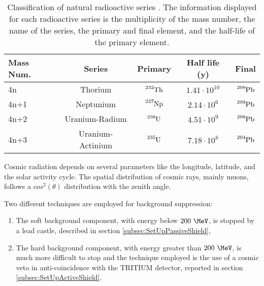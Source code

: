 \begin{table}[htbp]
\centering{}%
\begin{tabular}{lcccc}
\toprule 
Mass Num. & Series & Primary & Half life (y) & Final \tabularnewline
\midrule
\midrule 
4n & Thorium & $\ce{^{232}Th}$ & $1.41 \cdot{} 10^{10}$ & $\ce{^{208}Pb}$ \tabularnewline
4n+1 & Neptunium & $\ce{^{237}Np}$ & $2.14 \cdot{} 10^{6}$ & $\ce{^{209}Pb}$ \tabularnewline
4n+2 & Uranium-Radium & $\ce{^{238}U}$ & $4.51 \cdot{} 10^{9}$ & $\ce{^{206}Pb}$ \tabularnewline
4n+3 & Uranium-Actinium & $\ce{^{235}U}$ & $7.18 \cdot{} 10^{8}$ & $\ce{^{204}Pb}$ \tabularnewline
\bottomrule
\end{tabular}
\caption{Classification of natural radioactive series \cite{NaturalRadioactiveSeries1, NaturalRadioactiveSeries2}. The information displayed for each radioactive series is the multiplicity of the mass number, the name of the series, the primary and final element, and the half-life of the primary element.}
\label{tab:NaturalRadioactiveSeries}
\end{table}
Cosmic radiation depends on several parameters like the longitude, latitude, and the solar activity cycle. The spatial distribution of cosmic rays, mainly muons, follows a $cos^2(\theta)$ distribution with the zenith angle. 

Two different techniques are employed for background suppression:

\begin{enumerate}

\item{}  The soft background component, with energy below $200~\MeV$, is stopped by a lead castle, described in section \ref{subsec:SetUpPassiveShield},

\item{} The hard background component, with energy greater than $200~\MeV$, is much more difficult to stop and the technique employed is the use of a cosmic veto in anti-coincidence with the TRITIUM detector, reported in section \ref{subsec:SetUpActiveShield}. %

\end{enumerate}